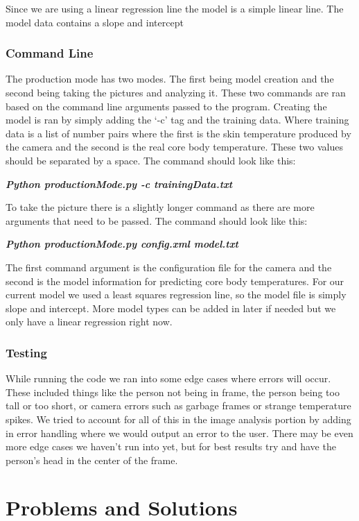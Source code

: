 	Since we are using a linear regression line the model is a simple linear line. The model data contains a slope and intercept
	
	
	
\subsubsection*{Command Line}
	The production mode has two modes. The first being model creation and the second being taking the pictures and analyzing it. These two commands are ran based on the command line arguments passed to the program. Creating the model is ran by simply adding the ‘-c’ tag and the training data.  Where training data is a list of number pairs where the first is the skin temperature produced by the camera and the second is the real core body temperature. These two values should be separated by a space. The command should look like this:
	
	\textbf{\emph{Python productionMode.py -c trainingData.txt}}
	

	To take the picture there is a slightly longer command as there are more arguments that need to be passed. The command should look like this:
	
	\textbf{\emph{Python productionMode.py config.xml model.txt}}
	
	The first command argument is the configuration file for the camera and the second is the model information for predicting core body temperatures. For our current model we used a least squares regression line, so the model file is simply slope and intercept. More model types can be added in later if needed but we only have a linear regression right now.
	
\subsubsection*{Testing}
	While running the code we ran into some edge cases where errors will occur. These included things like the person not being in frame, the person being too tall or too short, or camera errors such as garbage frames or strange temperature spikes. We tried to account for all of this in the image analysis portion by adding in error handling where we would output an error to the user. There may be even more edge cases we haven’t run into yet, but for best results try and have the person’s head in the center of the frame.
	

\section*{Problems and Solutions}

